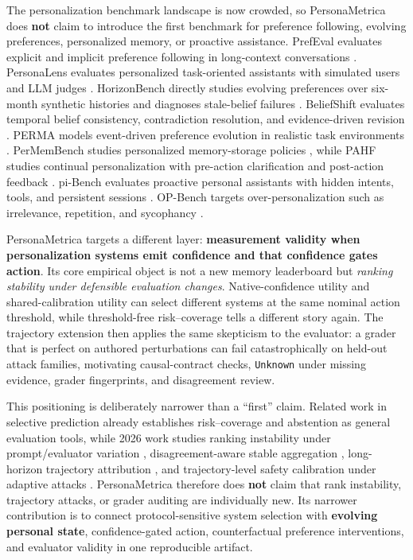 The personalization benchmark landscape is now crowded, so
PersonaMetrica does \textbf{not} claim to introduce the first benchmark
for preference following, evolving preferences, personalized memory, or
proactive assistance. PrefEval evaluates explicit and implicit
preference following in long-context conversations
\citep{zhao2025prefeval}. PersonaLens evaluates personalized
task-oriented assistants with simulated users and LLM judges
\citep{zhao2025personalens}. HorizonBench directly studies evolving
preferences over six-month synthetic histories and diagnoses
stale-belief failures \citep{li2026horizonbench}. BeliefShift evaluates
temporal belief consistency, contradiction resolution, and
evidence-driven revision \citep{myakala2026beliefshift}. PERMA models
event-driven preference evolution in realistic task environments
\citep{perma2026}. PerMemBench studies personalized memory-storage
policies \citep{in2026permem}, while PAHF studies continual
personalization with pre-action clarification and post-action feedback
\citep{liang2026pahf}. pi-Bench evaluates proactive personal assistants
with hidden intents, tools, and persistent sessions
\citep{zhang2026pibench}. OP-Bench targets over-personalization such as
irrelevance, repetition, and sycophancy \citep{hu2026opbench}.

PersonaMetrica targets a different layer: \textbf{measurement validity
when personalization systems emit confidence and that confidence gates
action}. Its core empirical object is not a new memory leaderboard but
\emph{ranking stability under defensible evaluation changes}.
Native-confidence utility and shared-calibration utility can select
different systems at the same nominal action threshold, while
threshold-free risk--coverage tells a different story again. The
trajectory extension then applies the same skepticism to the evaluator:
a grader that is perfect on authored perturbations can fail
catastrophically on held-out attack families, motivating causal-contract
checks, \texttt{Unknown} under missing evidence, grader fingerprints,
and disagreement review.

This positioning is deliberately narrower than a ``first'' claim.
Related work in selective prediction already establishes risk--coverage
and abstention as general evaluation tools, while 2026 work studies
ranking instability under prompt/evaluator variation
\citep{du2026promptstability, mahmood2026rankreversal},
disagreement-aware stable aggregation \citep{bonagiri2026stableval},
long-horizon trajectory attribution
\citep{chen2026trajectoryattribution}, and trajectory-level safety
calibration under adaptive attacks \citep{asif2026blindspot}.
PersonaMetrica therefore does \textbf{not} claim that rank instability,
trajectory attacks, or grader auditing are individually new. Its
narrower contribution is to connect protocol-sensitive system selection
with \textbf{evolving personal state}, confidence-gated action,
counterfactual preference interventions, and evaluator validity in one
reproducible artifact.

